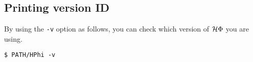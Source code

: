 \begin{enumerate}
\begin{itemize}
\end{itemize}

\subsection{Printing version ID}

By using the \verb|-v| option as follows, 
you can check which version of $\mathcal{H} \Phi$ you are using.

\begin{verbatim}
$ PATH/HPhi -v
\end{verbatim}

\end{enumerate}

